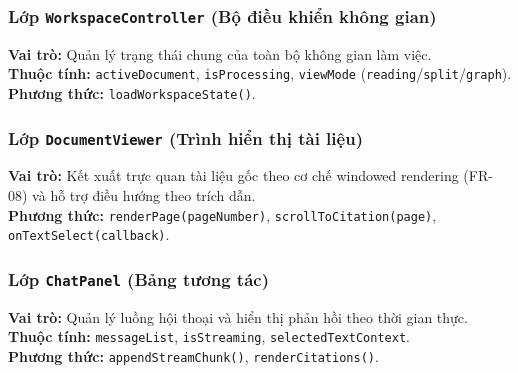 \subsubsection{Lớp \texttt{WorkspaceController} (Bộ điều khiển không gian)}
    \noindent\textbf{Vai trò:} Quản lý trạng thái chung của toàn bộ không gian làm việc.\\
    \textbf{Thuộc tính:} \texttt{activeDocument}, \texttt{isProcessing}, \texttt{viewMode} (\texttt{reading}/\texttt{split}/\texttt{graph}).\\
    \textbf{Phương thức:} \texttt{loadWorkspaceState()}.

\subsubsection{Lớp \texttt{DocumentViewer} (Trình hiển thị tài liệu)}
    \noindent\textbf{Vai trò:} Kết xuất trực quan tài liệu gốc theo cơ chế windowed rendering (FR-08) và hỗ trợ điều hướng theo trích dẫn.\\
    \textbf{Phương thức:} \texttt{renderPage(pageNumber)}, \texttt{scrollToCitation(page)}, \texttt{onTextSelect(callback)}.

\subsubsection{Lớp \texttt{ChatPanel} (Bảng tương tác)}
    \noindent\textbf{Vai trò:} Quản lý luồng hội thoại và hiển thị phản hồi theo thời gian thực.\\
    \textbf{Thuộc tính:} \texttt{messageList}, \texttt{isStreaming}, \texttt{selectedTextContext}.\\
    \textbf{Phương thức:} \texttt{appendStreamChunk()}, \texttt{renderCitations()}.
